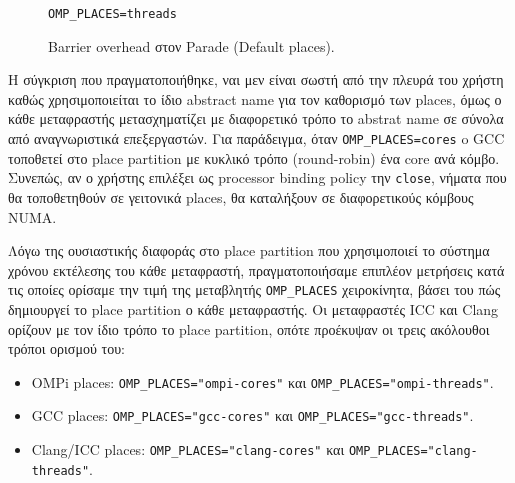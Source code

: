 \begin{figure}
\begin{minipage}{0.5\textwidth}
        \texttt{OMP\_PLACES=threads}
    \end{minipage}
    \caption{Barrier overhead στον Parade (Default places).}
    \label{fig:bo-parade-default-places}
\end{figure}


Η σύγκριση που πραγματοποιήθηκε, ναι μεν είναι σωστή από την πλευρά του χρήστη καθώς χρησιμοποιείται το ίδιο abstract name για τον καθορισμό των places, όμως ο κάθε μεταφραστής μετασχηματίζει με διαφορετικό τρόπο το abstrat name σε σύνολα από αναγνωριστικά επεξεργαστών. Για παράδειγμα, όταν \texttt{OMP\_PLACES=cores} o GCC τοποθετεί στο place partition με κυκλικό τρόπο (round-robin) ένα core ανά κόμβο. Συνεπώς, αν ο χρήστης επιλέξει ως processor binding policy την \texttt{close}, νήματα που θα τοποθετηθούν σε γειτονικά places, θα καταλήξουν σε διαφορετικούς κόμβους NUMA.

Λόγω της ουσιαστικής διαφοράς στο place partition που χρησιμοποιεί το σύστημα χρόνου εκτέλεσης του κάθε μεταφραστή, πραγματοποιήσαμε επιπλέον μετρήσεις κατά τις οποίες ορίσαμε την τιμή της μεταβλητής \texttt{OMP\_PLACES} χειροκίνητα, βάσει του πώς δημιουργεί το place partition ο κάθε μεταφραστής. Οι μεταφραστές ICC και Clang ορίζουν με τον ίδιο τρόπο το place partition, οπότε προέκυψαν οι τρεις ακόλουθοι τρόποι ορισμού του:
\begin{itemize}
	\item OMPi places: \texttt{OMP\_PLACES="ompi-cores"} και \texttt{OMP\_PLACES="ompi-threads"}.
	\item GCC places: \texttt{OMP\_PLACES="gcc-cores"} και \texttt{OMP\_PLACES="gcc-threads"}.
	\item Clang/ICC places: \texttt{OMP\_PLACES="clang-cores"} και \texttt{OMP\_PLACES="clang-threads"}.
\end{itemize}

